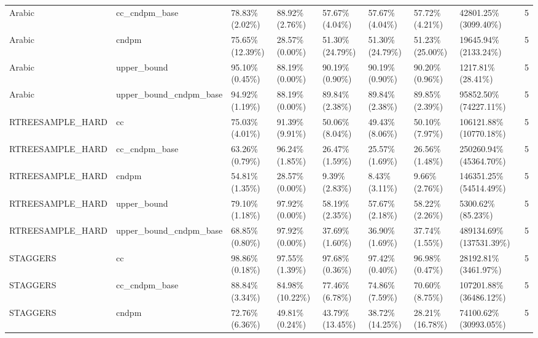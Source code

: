 \begin{tabular}{llllllllr}
          Arabic &          cc\_cndpm\_base &   78.83\% (2.02\%) &  88.92\% (2.76\%) &  57.67\% (4.04\%) &  57.67\% (4.04\%) &  57.72\% (4.21\%) &     42801.25\% (3099.40\%) &     5 \\
          Arabic &                  cndpm &  75.65\% (12.39\%) &  28.57\% (0.00\%) & 51.30\% (24.79\%) & 51.30\% (24.79\%) & 51.23\% (25.00\%) &     19645.94\% (2133.24\%) &     5 \\
          Arabic &            upper\_bound &   95.10\% (0.45\%) &  88.19\% (0.00\%) &  90.19\% (0.90\%) &  90.19\% (0.90\%) &  90.20\% (0.96\%) &        1217.81\% (28.41\%) &     5 \\
          Arabic & upper\_bound\_cndpm\_base &   94.92\% (1.19\%) &  88.19\% (0.00\%) &  89.84\% (2.38\%) &  89.84\% (2.38\%) &  89.85\% (2.39\%) &    95852.50\% (74227.11\%) &     5 \\
RTREESAMPLE\_HARD &                     cc &   75.03\% (4.01\%) &  91.39\% (9.91\%) &  50.06\% (8.04\%) &  49.43\% (8.06\%) &  50.10\% (7.97\%) &   106121.88\% (10770.18\%) &     5 \\
RTREESAMPLE\_HARD &          cc\_cndpm\_base &   63.26\% (0.79\%) &  96.24\% (1.85\%) &  26.47\% (1.59\%) &  25.57\% (1.69\%) &  26.56\% (1.48\%) &   250260.94\% (45364.70\%) &     5 \\
RTREESAMPLE\_HARD &                  cndpm &   54.81\% (1.35\%) &  28.57\% (0.00\%) &   9.39\% (2.83\%) &   8.43\% (3.11\%) &   9.66\% (2.76\%) &   146351.25\% (54514.49\%) &     5 \\
RTREESAMPLE\_HARD &            upper\_bound &   79.10\% (1.18\%) &  97.92\% (0.00\%) &  58.19\% (2.35\%) &  57.67\% (2.18\%) &  58.22\% (2.26\%) &        5300.62\% (85.23\%) &     5 \\
RTREESAMPLE\_HARD & upper\_bound\_cndpm\_base &   68.85\% (0.80\%) &  97.92\% (0.00\%) &  37.69\% (1.60\%) &  36.90\% (1.69\%) &  37.74\% (1.55\%) &  489134.69\% (137531.39\%) &     5 \\
        STAGGERS &                     cc &   98.86\% (0.18\%) &  97.55\% (1.39\%) &  97.68\% (0.36\%) &  97.42\% (0.40\%) &  96.98\% (0.47\%) &     28192.81\% (3461.97\%) &     5 \\
        STAGGERS &          cc\_cndpm\_base &   88.84\% (3.34\%) & 84.98\% (10.22\%) &  77.46\% (6.78\%) &  74.86\% (7.59\%) &  70.60\% (8.75\%) &   107201.88\% (36486.12\%) &     5 \\
        STAGGERS &                  cndpm &   72.76\% (6.36\%) &  49.81\% (0.24\%) & 43.79\% (13.45\%) & 38.72\% (14.25\%) & 28.21\% (16.78\%) &    74100.62\% (30993.05\%) &     5 \\

\end{tabular}
